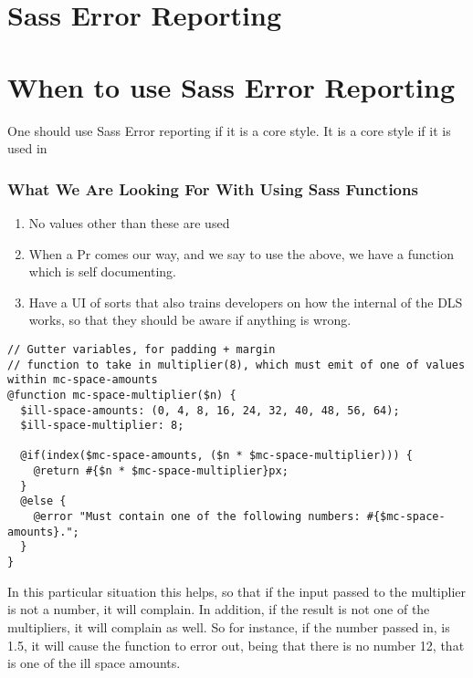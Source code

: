 \maketitle{}
\section{ Sass Error Reporting }

\section{ When to use Sass Error Reporting }
One should use Sass Error reporting if it is a core style. It is a core style if
it is used in

\subsubsection{ What We Are Looking For With Using Sass Functions }
\begin{enumerate}
  \item No values other than these are used
  \item When a Pr comes our way, and we say to use the above, we have a function which is self documenting.
  \item Have a UI of sorts that also trains developers on how the internal of
  the DLS works, so that they should be aware if anything is wrong.
\end{enumerate}

\begin{lstlisting}
// Gutter variables, for padding + margin
// function to take in multiplier(8), which must emit of one of values within mc-space-amounts
@function mc-space-multiplier($n) {
  $ill-space-amounts: (0, 4, 8, 16, 24, 32, 40, 48, 56, 64);
  $ill-space-multiplier: 8;

  @if(index($mc-space-amounts, ($n * $mc-space-multiplier))) {
    @return #{$n * $mc-space-multiplier}px;
  }
  @else {
    @error "Must contain one of the following numbers: #{$mc-space-amounts}.";
  }
}
\end{lstlisting}

In this particular situation this helps, so that if the input passed to the
multiplier is not a number, it will complain. In addition, if the result is not
one of the multipliers, it will complain as well. So for instance, if the number
passed in, is 1.5, it will cause the function to error out, being that there is
no number 12, that is one of the ill space amounts.
